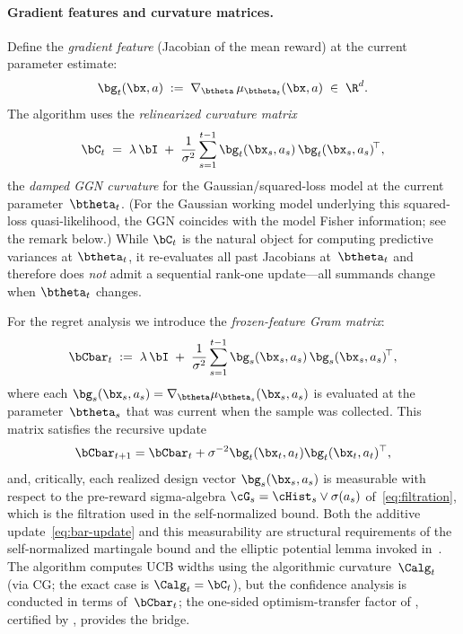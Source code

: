 \paragraph{Gradient features and curvature matrices.}
Define the \emph{gradient feature} (Jacobian of the mean reward) at the
current parameter estimate:
\begin{equation}\label{eq:gfeat}
  \bg_t(\bx,a) \;:=\; \nabla_{\btheta}\,\mu_{\btheta_t}(\bx,a)
  \;\in\;\R^d.
\end{equation}
The algorithm uses the \emph{relinearized curvature matrix}
\begin{equation}\label{eq:curvature}
  \bC_t
  \;=\;
  \lambda\,\bI
  \;+\;
  \frac{1}{\sigma^2}\sum_{s=1}^{t-1}
    \bg_t(\bx_s,a_s)\,\bg_t(\bx_s,a_s)^{\!\top},
\end{equation}
the \emph{damped GGN curvature} for the Gaussian/squared-loss model
at the current parameter~$\btheta_t$.
(For the Gaussian working model underlying this squared-loss quasi-likelihood,
the GGN coincides with the model Fisher information; see the remark below.)
While $\bC_t$ is the natural object for
computing predictive variances at $\btheta_t$, it
re-evaluates all past Jacobians at~$\btheta_t$ and therefore does
\emph{not} admit a sequential rank-one update---all summands change
when $\btheta_t$ changes.

For the regret analysis we introduce the
\emph{frozen-feature Gram matrix}:
\begin{equation}\label{eq:curvature-bar}
  \bCbar_t
  \;:=\;
  \lambda\,\bI
  \;+\;
  \frac{1}{\sigma^2}\sum_{s=1}^{t-1}
    \bg_s(\bx_s,a_s)\,\bg_s(\bx_s,a_s)^{\!\top},
\end{equation}
where each $\bg_s(\bx_s,a_s)=\nabla_{\btheta}\mu_{\btheta_s}(\bx_s,a_s)$
is evaluated at the parameter~$\btheta_s$ that was current when the sample
was collected.  This matrix satisfies the recursive update
\begin{equation}\label{eq:bar-update}
  \bCbar_{t+1}=\bCbar_t+\sigma^{-2}\bg_t(\bx_t,a_t)\bg_t(\bx_t,a_t)^\top,
\end{equation}
and, critically, each realized design vector
$\bg_s(\bx_s,a_s)$ is measurable with respect to the pre-reward
sigma-algebra $\cG_s=\cHist_s\vee\sigma(a_s)$ of~\eqref{eq:filtration},
which is the filtration used in the self-normalized bound.
Both the additive update~\eqref{eq:bar-update} and
this measurability are structural requirements of the
self-normalized martingale bound and the elliptic potential lemma invoked
in~.
The algorithm computes UCB widths using the algorithmic curvature~$\Calg_t$
(via CG; the exact case is $\Calg_t=\bC_t$), but the confidence analysis is
conducted in terms of~$\bCbar_t$; the one-sided optimism-transfer factor
of , certified by , provides the
bridge.

